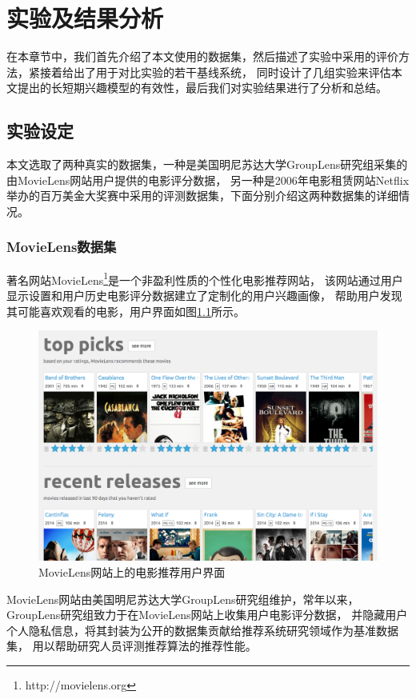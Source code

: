 \chapter{实验及结果分析}
在本章节中，我们首先介绍了本文使用的数据集，然后描述了实验中采用的评价方法，紧接着给出了用于对比实验的若干基线系统，
同时设计了几组实验来评估本文提出的长短期兴趣模型的有效性，最后我们对实验结果进行了分析和总结。

\section{实验设定}
本文选取了两种真实的数据集，一种是美国明尼苏达大学GroupLens研究组采集的由MovieLens网站用户提供的电影评分数据，
另一种是2006年电影租赁网站Netflix举办的百万美金大奖赛中采用的评测数据集，下面分别介绍这两种数据集的详细情况。

\subsection{MovieLens数据集}
著名网站MovieLens\footnote{http://movielens.org}是一个非盈利性质的个性化电影推荐网站，
该网站通过用户显示设置和用户历史电影评分数据建立了定制化的用户兴趣画像，
帮助用户发现其可能喜欢观看的电影，用户界面如图\ref{fig:movielens}所示。

\begin{figure}[htbp]
\centering
\includegraphics[scale=0.36]{images/movielens.png}
\caption{MovieLens网站上的电影推荐用户界面}
\label{fig:movielens}
\end{figure}

MovieLens网站由美国明尼苏达大学GroupLens研究组维护，常年以来，
GroupLens研究组致力于在MovieLens网站上收集用户电影评分数据，
并隐藏用户个人隐私信息，将其封装为公开的数据集贡献给推荐系统研究领域作为基准数据集，
用以帮助研究人员评测推荐算法的推荐性能。

